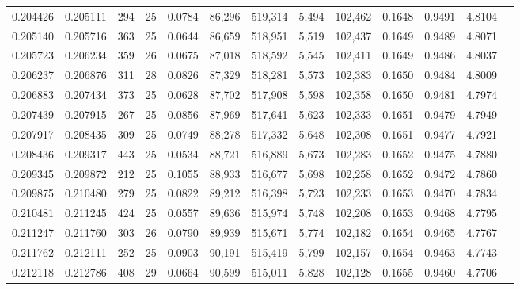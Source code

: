 \begin{tabular}{rrrrrrrrrrrrr}
0.204426 & 0.205111 &   294 &  25 &                                     0.0784 &  86,296 & 519,314 &   5,494 & 102,462 & 0.1648 & 0.9491 & 4.8104 \\
0.205140 & 0.205716 &   363 &  25 &                                     0.0644 &  86,659 & 518,951 &   5,519 & 102,437 & 0.1649 & 0.9489 & 4.8071 \\
0.205723 & 0.206234 &   359 &  26 &                                     0.0675 &  87,018 & 518,592 &   5,545 & 102,411 & 0.1649 & 0.9486 & 4.8037 \\
0.206237 & 0.206876 &   311 &  28 &                                     0.0826 &  87,329 & 518,281 &   5,573 & 102,383 & 0.1650 & 0.9484 & 4.8009 \\
0.206883 & 0.207434 &   373 &  25 &                                     0.0628 &  87,702 & 517,908 &   5,598 & 102,358 & 0.1650 & 0.9481 & 4.7974 \\
0.207439 & 0.207915 &   267 &  25 &                                     0.0856 &  87,969 & 517,641 &   5,623 & 102,333 & 0.1651 & 0.9479 & 4.7949 \\
0.207917 & 0.208435 &   309 &  25 &                                     0.0749 &  88,278 & 517,332 &   5,648 & 102,308 & 0.1651 & 0.9477 & 4.7921 \\
0.208436 & 0.209317 &   443 &  25 &                                     0.0534 &  88,721 & 516,889 &   5,673 & 102,283 & 0.1652 & 0.9475 & 4.7880 \\
0.209345 & 0.209872 &   212 &  25 &                                     0.1055 &  88,933 & 516,677 &   5,698 & 102,258 & 0.1652 & 0.9472 & 4.7860 \\
0.209875 & 0.210480 &   279 &  25 &                                     0.0822 &  89,212 & 516,398 &   5,723 & 102,233 & 0.1653 & 0.9470 & 4.7834 \\
0.210481 & 0.211245 &   424 &  25 &                                     0.0557 &  89,636 & 515,974 &   5,748 & 102,208 & 0.1653 & 0.9468 & 4.7795 \\
0.211247 & 0.211760 &   303 &  26 &                                     0.0790 &  89,939 & 515,671 &   5,774 & 102,182 & 0.1654 & 0.9465 & 4.7767 \\
0.211762 & 0.212111 &   252 &  25 &                                     0.0903 &  90,191 & 515,419 &   5,799 & 102,157 & 0.1654 & 0.9463 & 4.7743 \\
0.212118 & 0.212786 &   408 &  29 &                                     0.0664 &  90,599 & 515,011 &   5,828 & 102,128 & 0.1655 & 0.9460 & 4.7706 \\

\end{tabular}
